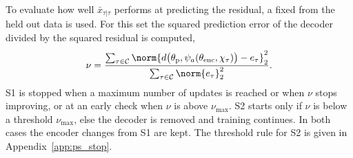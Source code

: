 To evaluate how well $\bar x_{\tau|\tau}$ performs at predicting the residual, a
fixed  from the held out data is used.
For this set the squared prediction error of the decoder
divided by the squared residual is computed,
\begin{equation}
 \nu=\frac{\sum_{\tau\in\mathcal C}\norm{d\bigl(\theta_{\mathrm p},\psi_a(\theta_{\mathrm{enc}},\chi_\tau)\bigr)-e_\tau}_2^2}
 {\sum_{\tau\in\mathcal C}\norm{e_\tau}_2^2}.
 \label{eq:ps2_nu}
\end{equation}
S1 is stopped when a maximum number of updates is reached or when $\nu$ stops improving, or at an early check when $\nu$ is above $\nu_{\max}$.
S2 starts only if $\nu$ is below a threshold $\nu_{\max}$, else the decoder is removed 
and training continues. In both cases the encoder changes from S1 are kept.
The threshold rule for S2 is given in Appendix~\ref{app:ps_stop}.


